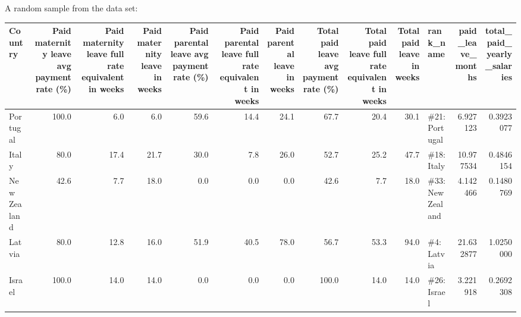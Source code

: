 \documentclass[]{book}
\theoremstyle{definition}
\theoremstyle{definition}
\theoremstyle{definition}
\theoremstyle{remark}
\begin{document}
A random sample from the data set:

\begin{tabular}{l|r|r|r|r|r|r|r|r|r|l|r|r}
\hline
Country & Paid maternity leave avg payment rate (\%) & Paid maternity leave full rate equivalent in weeks & Paid maternity leave in weeks & Paid parental leave avg payment rate (\%) & Paid parental leave full rate equivalent in weeks & Paid parental leave in weeks & Total paid leave avg payment rate (\%) & Total paid leave full rate equivalent in weeks & Total paid leave in weeks & rank\_name & paid\_leave\_months & total\_paid\_yearly\_salaries\\
\hline
Portugal & 100.0 & 6.0 & 6.0 & 59.6 & 14.4 & 24.1 & 67.7 & 20.4 & 30.1 & \#21: Portugal & 6.927123 & 0.3923077\\
\hline
Italy & 80.0 & 17.4 & 21.7 & 30.0 & 7.8 & 26.0 & 52.7 & 25.2 & 47.7 & \#18: Italy & 10.977534 & 0.4846154\\
\hline
New Zealand & 42.6 & 7.7 & 18.0 & 0.0 & 0.0 & 0.0 & 42.6 & 7.7 & 18.0 & \#33: New Zealand & 4.142466 & 0.1480769\\
\hline
Latvia & 80.0 & 12.8 & 16.0 & 51.9 & 40.5 & 78.0 & 56.7 & 53.3 & 94.0 & \#4: Latvia & 21.632877 & 1.0250000\\
\hline
Israel & 100.0 & 14.0 & 14.0 & 0.0 & 0.0 & 0.0 & 100.0 & 14.0 & 14.0 & \#26: Israel & 3.221918 & 0.2692308\\
\hline
\end{tabular}
\end{document}
